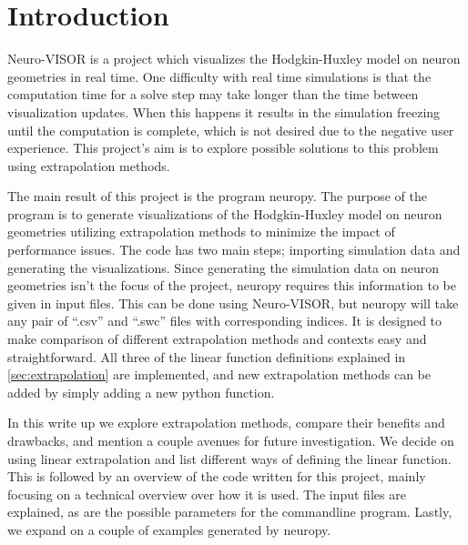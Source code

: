 
\section{Introduction}%
\label{sec:introduction}

Neuro-VISOR is a project which visualizes the Hodgkin-Huxley model on neuron geometries in real time\cite{neuroVISOR}.
One difficulty with real time simulations is that the computation time for a solve step may take longer than the time between visualization updates.
When this happens it results in the simulation freezing until the computation is complete, which is not desired due to the negative user experience.
This project's aim is to explore possible solutions to this problem using extrapolation methods.

The main result of this project is the program neuropy\cite{neuropy}.
The purpose of the program is to generate visualizations of the Hodgkin-Huxley model on neuron geometries utilizing extrapolation methods to minimize the impact of performance issues.
The code has two main steps; importing simulation data and generating the visualizations.
Since generating the simulation data on neuron geometries isn't the focus of the project, neuropy requires this information to be given in input files.
This can be done using Neuro-VISOR, but neuropy will take any pair of ``.csv'' and ``.swc'' files with corresponding indices.
It is designed to make comparison of different extrapolation methods and contexts easy and straightforward. 
All three of the linear function definitions explained in \cref{sec:extrapolation} are implemented, and new extrapolation methods can be added by simply adding a new python function.

In this write up we explore extrapolation methods, compare their benefits and drawbacks, and mention a couple avenues for future investigation.
We decide on using linear extrapolation and list different ways of defining the linear function.
This is followed by an overview of the code written for this project, mainly focusing on a technical overview over how it is used.
The input files are explained, as are the possible parameters for the commandline program.
Lastly, we expand on a couple of examples generated by neuropy.
